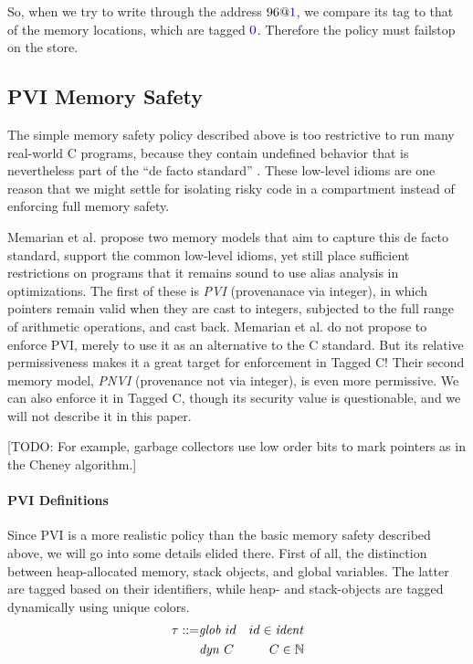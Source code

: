 \documentclass{llncs}
\begin{document}
So, when we try to write through the address \(96@{\color{blue} 1}\), we compare its tag to that of the memory
locations, which are tagged \({\color{blue} 0}\). Therefore the policy must failstop on the store.

\subsection{PVI Memory Safety}
\label{sec:PVI}

The simple memory safety policy described above is too restrictive to run many real-world
C programs, because they contain undefined behavior that is nevertheless part of the
``de facto standard'' \cite{???}. These low-level idioms are one reason that we might
settle for isolating risky code in a compartment instead of enforcing full memory safety.

Memarian et al. \cite{???} propose two memory models that aim to capture this
de facto standard, support the common low-level idioms, yet still place sufficient
restrictions on programs that it remains sound to use alias analysis in optimizations.
The first of these is {\it PVI} (provenanace via integer), in which pointers remain valid
when they are cast to integers, subjected to the full range of arithmetic operations, and
cast back. Memarian et al. do not propose to enforce PVI, merely to use it as an alternative to the
C standard. But its relative permissiveness makes it a great target for enforcement in Tagged C!
Their second memory model, {\it PNVI} (provenance not via integer), is even more permissive.
We can also enforce it in Tagged C, though its security value is questionable, and we will
not describe it in this paper.

[TODO: For example, garbage collectors use low order bits to mark pointers as in the Cheney algorithm.]

\paragraph*{PVI Definitions}

Since PVI is a more realistic policy than the basic memory safety described above,
we will go into some details elided there. First of all, the distinction between
heap-allocated memory, stack objects, and global variables. The latter are tagged
based on their identifiers, while heap- and stack-objects are tagged dynamically
using unique colors.
%
\begin{align*}
  \tau ::= & \mathit{glob} ~ id & id \in \mathit{ident} \\
  & \mathit{dyn} ~ C & C \in \mathbb{N} \\
\end{align*}
\end{document}
